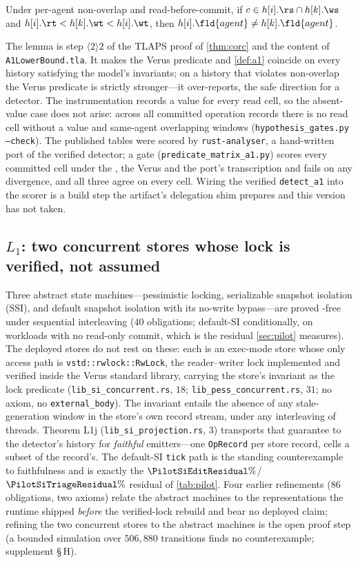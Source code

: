 \begin{lemma}
\label{lem:same-agent}
Under per-agent non-overlap and read-before-commit, if
$c\in h[i].\rs\cap h[k].\ws$ and $h[i].\rt<h[k].\wt<h[i].\wt$, then
$h[i].\fld{agent}\neq h[k].\fld{agent}$.
\end{lemma}
The lemma is step $\langle2\rangle2$ of the TLAPS proof of \cref{thm:corc}
and the content of \texttt{A1LowerBound.tla}. It makes the Verus predicate
and \cref{def:a1} coincide on every history satisfying the model's invariants;
on a history that violates non-overlap the Verus predicate is strictly
stronger---it over-reports, the safe direction for a detector. The
instrumentation records a value for every read cell, so the absent-value case
does not arise: across all \HypRecords{} committed operation records there
is no read cell without a value and \HypSameAgentOverlaps{} same-agent
overlapping windows (\texttt{hypothesis\_gates.py --check}). The published tables were
scored by \texttt{rust-analyser}, a hand-written port of the verified
detector; a gate (\texttt{predicate\_matrix\_a1.py}) scores every committed
cell under the \TLA{}, the Verus and the port's transcription and fails on
any divergence, and all three agree on every cell. Wiring the verified
\texttt{detect\_a1} into the scorer is a build step the artifact's delegation
shim prepares and this version has not taken.

\subsection{$L_1$: two concurrent stores whose lock is verified, not assumed}
\label{sec:l1}
Three abstract state machines---pessimistic locking, serializable snapshot
isolation (SSI), and default snapshot isolation with its no-write bypass---are
proved -free under sequential interleaving ($40$ obligations; default-SI
conditionally, on workloads with no read-only commit, which is the residual
\cref{sec:pilot} measures). The deployed stores do not rest on these: each is
an exec-mode store whose only access path is \texttt{vstd::rwlock::RwLock},
the reader--writer lock implemented and verified inside the Verus standard
library, carrying the store's invariant as the lock predicate
(\texttt{lib\_si\_concurrent.rs}, $18$; \texttt{lib\_pess\_concurrent.rs},
$31$; no axiom, no \texttt{external\_body}). The invariant entails the absence
of any stale-generation window in the store's own record stream, under any
interleaving of threads. Theorem L1j (\texttt{lib\_si\_projection.rs}, $3$)
transports that guarantee to the detector's history for \emph{faithful}
emitters---one \texttt{OpRecord} per store record, cells a subset of the
record's. The default-SI \texttt{tick} path is the standing counterexample to
faithfulness and is exactly the $\PilotSiEditResidual\%$/$\PilotSiTriageResidual\%$
residual of \cref{tab:pilot}. Four earlier refinements ($86$ obligations,
two axioms) relate the abstract machines to the representations the runtime
shipped \emph{before} the verified-lock rebuild and bear no deployed claim;
refining the two concurrent stores to the abstract machines is the open
proof step (a bounded simulation over $506{,}880$ transitions finds no
counterexample; supplement \S\,H).

